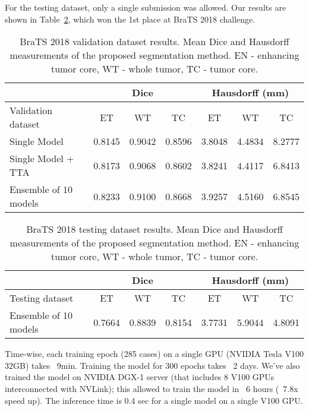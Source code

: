 \documentclass[runningheads]{llncs}
\newcommand{\0}{\ensuremath{\mathbf{0}}}
\newcommand{\1}{\ensuremath{\mathbf{1}}}
\begin{document}
 For the testing dataset, only a single submission was allowed. Our results are shown in  Table~\ref{tab:testresults}, which won the 1st place at BraTS 2018 challenge. 

 
\begin{table}
	\centering
\caption{BraTS 2018 validation dataset results. Mean Dice and Hausdorff measurements of the proposed segmentation method. EN - enhancing tumor core, WT - whole tumor, TC - tumor core.}
	\label{tab:valid}
	\begin{tabular}{l|c|c|c|c|c|c}
		\hline
		& \multicolumn{3}{c|}{Dice} & \multicolumn{3}{c}{Hausdorff (mm)}  \\ \hline
		Validation dataset & ET & WT & TC & ET & WT & TC \\ \hline
		Single Model & 0.8145 & 0.9042 & 0.8596 & 3.8048 & 4.4834 & 8.2777 \\
		Single Model + TTA & 0.8173 & 0.9068 & 0.8602 & 3.8241 & 4.4117 & 6.8413 \\
		Ensemble of 10 models  & 0.8233 & 0.9100 & 0.8668 & 3.9257 & 4.5160 & 6.8545 \\
		\hline
	\end{tabular}
\end{table}
 

\begin{table}
	\centering
\caption{BraTS 2018 testing dataset results. Mean Dice and Hausdorff measurements of the proposed segmentation method.  EN - enhancing tumor core, WT - whole tumor, TC - tumor core.}
	\label{tab:testresults}
	\begin{tabular}{l|c|c|c|c|c|c}
		\hline
		& \multicolumn{3}{c|}{Dice} & \multicolumn{3}{c}{Hausdorff (mm)}  \\ \hline
		Testing dataset  & ET & WT & TC & ET & WT & TC \\ \hline
		Ensemble of 10 models & 0.7664 & 0.8839 & 0.8154 & 3.7731 & 5.9044 & 4.8091 \\

		\hline
	\end{tabular}

\end{table}

Time-wise, each training epoch (285 cases) on a single GPU (NVIDIA Tesla V100 32GB) takes ~9min. Training the model for 300 epochs takes ~2 days. We've also trained the model on NVIDIA DGX-1 server (that includes 8 V100 GPUs  interconnected with NVLink); this allowed to train the model in ~6 hours (~7.8x speed up). The inference time is 0.4 sec for a single model on a single V100 GPU.
\end{document}
